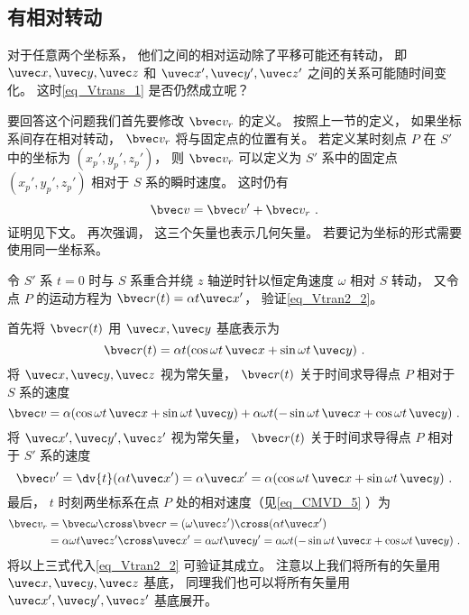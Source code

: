 

\subsection{有相对转动}
对于任意两个坐标系， 他们之间的相对运动除了平移可能还有转动， 即 $\uvec x, \uvec y, \uvec z$ 和 $\uvec x', \uvec y', \uvec z'$ 之间的关系可能随时间变化。 这时\autoref{eq_Vtrans_1}  是否仍然成立呢？

要回答这个问题我们首先要修改 $\bvec v_r$ 的定义。 按照上一节的定义， 如果坐标系间存在相对转动， $\bvec v_r$ 将与固定点的位置有关。 若定义某时刻点 $P$ 在 $S'$ 中的坐标为 $(x_p', y_p', z_p')$， 则 $\bvec v_r$ 可以定义为 $S'$ 系中的固定点 $(x_p', y_p', z_p')$ 相对于 $S$ 系的瞬时速度。 这时仍有
\begin{equation}\label{eq_Vtran2_2}
\bvec v = \bvec v' + \bvec v_r~.
\end{equation}
证明见下文。 再次强调， 这三个矢量也表示几何矢量。 若要记为坐标的形式需要使用同一坐标系。

\begin{example}{}\label{ex_Vtran2_1}
令 $S'$ 系 $t = 0$ 时与 $S$ 系重合并绕 $z$ 轴逆时针以恒定角速度 $\omega$ 相对 $S$ 转动， 又令点 $P$ 的运动方程为 $\bvec r(t) = \alpha t \uvec x'$， 验证\autoref{eq_Vtran2_2}。

首先将 $\bvec r(t)$ 用 $\uvec x, \uvec y$ 基底表示为
\begin{equation}
\bvec r(t) = \alpha t (\cos\omega t\, \uvec x + \sin\omega t\, \uvec y)~.
\end{equation}
将 $\uvec x, \uvec y, \uvec z$ 视为常矢量， $\bvec r(t)$ 关于时间求导得点 $P$ 相对于 $S$ 系的速度
\begin{equation}
\bvec v = \alpha (\cos\omega t \,\uvec x + \sin\omega t \,\uvec y)
+ \alpha\omega t (-\sin\omega t \,\uvec x + \cos\omega t \,\uvec y)~.
\end{equation}
将 $\uvec x', \uvec y', \uvec z'$ 视为常矢量， $\bvec r(t)$ 关于时间求导得点 $P$ 相对于 $S'$ 系的速度
\begin{equation}
\bvec v' = \dv{t} (\alpha t \uvec x') = \alpha \uvec x' = \alpha (\cos\omega t\, \uvec x + \sin\omega t \,\uvec y)~.
\end{equation}
最后， $t$ 时刻两坐标系在点 $P$ 处的相对速度（见\autoref{eq_CMVD_5}  ）为
\begin{equation}\label{eq_Vtran2_3}
\begin{aligned}
\bvec v_r &= \bvec\omega \cross \bvec r = (\omega \uvec z') \cross (\alpha t \uvec x') \\
&= \alpha\omega t \uvec z'\cross\uvec x' = \alpha\omega t \uvec y' = \alpha\omega t(-\sin \omega t \,\uvec x + \cos\omega t \,\uvec y)~.
\end{aligned}\end{equation}
将以上三式代入\autoref{eq_Vtran2_2} 可验证其成立。 注意以上我们将所有的矢量用 $\uvec x, \uvec y, \uvec z$ 基底， 同理我们也可以将所有矢量用 $\uvec x', \uvec y', \uvec z'$ 基底展开。
\end{example}

